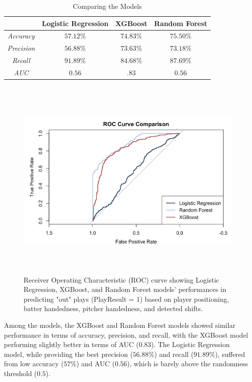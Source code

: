 \documentclass{article}
\begin{document}
\begin{table}[h!]
\centering
\begin{tabular}{|c|c|c|c|}
\hline
& \textbf{Logistic Regression}  & \textbf{XGBoost} & \textbf{Random Forest} \\
\hline
\textit{Accuracy} & $57.12\%$ & $74.83\%$ & $75.50\%$\\
\textit{Precision} & $56.88\%$ & $73.63\%$ & $73.18\%$\\
\textit{Recall} & $91.89\%$ & $84.68\%$ & $87.69\%$\\
\textit{AUC} &  $0.56$  & $.83$ & $0.56$ \\
\hline
\end{tabular}
\caption{Comparing the Models}
\end{table}


\vspace{.4cm}
\begin{figure}[h]
    \centering
    \includegraphics[height=10cm]{images/roc_comp.png}
    \caption{Receiver Operating Characteristic (ROC) curve showing Logistic Regression, XGBoost, and Random Forest models' performances in predicting "out" plays (PlayResult = 1) based on player positioning, batter handedness, pitcher handedness, and detected shifts.}
\end{figure}
\vspace{.7cm}

Among the models, the XGBoost and Random Forest models showed similar performance in terms of accuracy, precision, and recall, with the XGBoost model performing slightly better in terms of AUC ($0.83$). The Logistic Regression model, while providing the best precision ($56.88\%$) and recall ($91.89\%$), suffered from low accuracy ($57\%$) and AUC ($0.56$), which is barely above the randomness threshold ($0.5$).
\end{document}
